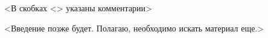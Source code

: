 
<В скобках <> указаны комментарии>

<Введение позже будет. Полагаю, необходимо искать материал еще.>

\clearpage
